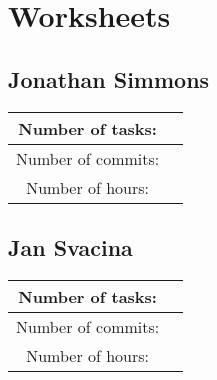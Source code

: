 \documentclass{article}
\begin{document}
    

    

    


    \section{Worksheets}


    \subsection*{Jonathan Simmons}

    \begin{center}
        \begin{tabular}{||c c ||}
            \hline
            Number of tasks: &  \\
            \hline
            Number of commits: &  \\
            \hline
            Number of hours: &  \\
            \hline
        \end{tabular}
    \end{center}

    \subsection*{Jan Svacina}

    \begin{center}
        \begin{tabular}{||c c ||}
            \hline
            Number of tasks: &  \\
            \hline
            Number of commits: &  \\
            \hline
            Number of hours: &  \\
            \hline
        \end{tabular}
    \end{center}
\end{document}
